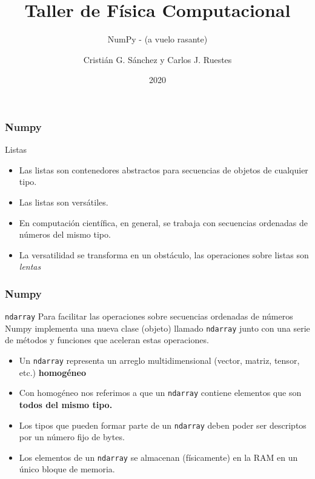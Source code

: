 \documentclass{beamer}
\title{Taller de Física Computacional}
\subtitle{NumPy - (a vuelo rasante)}
\author{Cristián G. Sánchez y Carlos J. Ruestes}
\date{2020}
\begin{document}
\frame{\titlepage}

\begin{frame}[fragile]
    \frametitle{Numpy}
 
    \begin{block}{Listas}
        \begin{itemize}
            \item Las listas son contenedores abstractos para secuencias de objetos de cualquier tipo.
            \item Las listas son versátiles.
            \item En computación científica, en general, se trabaja con secuencias ordenadas de números del mismo tipo.
            \item La versatilidad se transforma en un obstáculo, las operaciones sobre listas son {\em lentas} 
        \end{itemize}
    \end{block}

    \end{frame}

\begin{frame}[fragile]
    \frametitle{Numpy}
 
    \begin{block}{{\tt ndarray}}
        Para facilitar las operaciones sobre secuencias ordenadas de números Numpy implementa una nueva clase
        (objeto) llamado {\tt ndarray} junto con una serie de métodos y funciones que aceleran estas operaciones.
        \begin{itemize}
            \item Un {\tt ndarray} representa un arreglo multidimensional (vector, matriz, tensor, etc.)
            {\bf homogéneo}
            \item Con homogéneo nos referimos a que un {\tt ndarray} contiene elementos que son {\bf todos del mismo tipo.}
            \item Los tipos que pueden formar parte de un {\tt ndarray} deben poder ser descriptos por un número fijo de bytes.
            \item Los elementos de un {\tt ndarray} se almacenan (físicamente) en la RAM en un único bloque de memoria.
        \end{itemize}
    \end{block}

    \end{frame}
\end{document}
